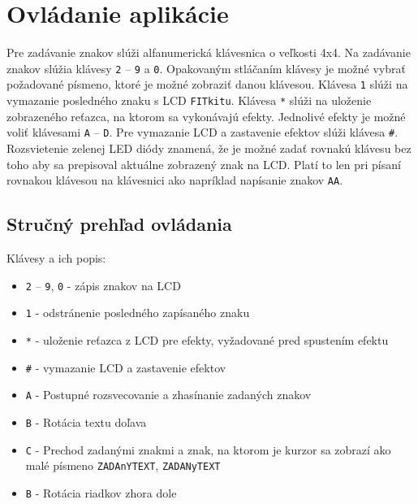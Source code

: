 \documentclass[10pt,a4paper,final]{article}
\begin{document}
\section{Ovládanie aplikácie}

\noindent Pre zadávanie znakov slúži alfanumerická klávesnica o veľkosti 4x4\cite{keyboard}. Na zadávanie znakov slúžia klávesy \texttt{2} -- \texttt{9} a \texttt{0}. Opakovaným stláčaním klávesy je možné vybrať požadované písmeno, ktoré je možné zobraziť danou klávesou. Klávesa \texttt{1} slúži na vymazanie posledného znaku s LCD \texttt{FITkitu}. Klávesa \texttt{*} slúži na uloženie zobrazeného reťazca, na ktorom sa vykonávajú efekty. Jednolivé efekty je možné voliť klávesami \texttt{A} -- \texttt{D}. Pre vymazanie LCD a zastavenie efektov slúži klávesa \texttt{\#}.
Rozsvietenie zelenej LED diódy znamená, že je možné zadať rovnakú klávesu bez toho aby sa prepisoval aktuálne zobrazený znak na LCD. Platí to len pri písaní rovnakou klávesou na klávesnici ako napríklad napísanie znakov \texttt{AA}.

\subsection{Stručný prehľad ovládania}

Klávesy a ich popis:
\begin{itemize}
	\item \texttt{2} -- \texttt{9}, \texttt{0} - zápis znakov na LCD
	\item \texttt{1} - odstránenie posledného zapísaného znaku
	\item \texttt{*} - uloženie reťazca z LCD pre efekty, vyžadované pred spustením efektu
	\item \texttt{\#} - vymazanie LCD a zastavenie efektov
	\item \texttt{A} - Postupné rozsvecovanie a zhasínanie zadaných znakov
	\item \texttt{B} - Rotácia textu doľava
	\item \texttt{C} - Prechod zadanými znakmi a znak, na ktorom je kurzor sa zobrazí ako malé písmeno \texttt{ZADAnYTEXT}, \texttt{ZADANyTEXT}
	\item \texttt{B} - Rotácia riadkov zhora dole
\end{itemize}
\end{document}
